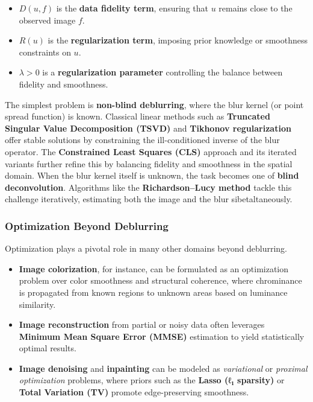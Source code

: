 \documentclass[11pt]{article}
\providecommand{\tightlist}{%
      \setlength{\itemsep}{0pt}\setlength{\parskip}{0pt}}
\begin{document}
\begin{itemize}
\tightlist
\item
  \(D(u, f)\) is the \textbf{data fidelity term}, ensuring that \(u\)
  remains close to the observed image \(f\).
\item
  \(R(u)\) is the \textbf{regularization term}, imposing prior knowledge
  or smoothness constraints on \(u\).
\item
  \(\lambda > 0\) is a \textbf{regularization parameter} controlling the
  balance between fidelity and smoothness.
\end{itemize}

The simplest problem is \textbf{non-blind deblurring}, where the blur
kernel (or point spread function) is known. Classical linear methods
such as \textbf{Truncated Singular Value Decomposition (TSVD)} and
\textbf{Tikhonov regularization} offer stable solutions by constraining
the ill-conditioned inverse of the blur operator. The
\textbf{Constrained Least Squares (CLS)} approach and its iterated
variants further refine this by balancing fidelity and smoothness in the
spatial domain. When the blur kernel itself is unknown, the task becomes
one of \textbf{blind deconvolution}. Algorithms like the
\textbf{Richardson--Lucy method} tackle this challenge iteratively,
estimating both the image and the blur sibetaltaneously.

\hypertarget{optimization-beyond-deblurring}{%
\subsubsection{\texorpdfstring{\textbf{Optimization Beyond
Deblurring}}{Optimization Beyond Deblurring}}\label{optimization-beyond-deblurring}}

Optimization plays a pivotal role in many other domains beyond
deblurring.

\begin{itemize}
\tightlist
\item
  \textbf{Image colorization}, for instance, can be formulated as an
  optimization problem over color smoothness and structural coherence,
  where chrominance is propagated from known regions to unknown areas
  based on luminance similarity.
\item
  \textbf{Image reconstruction} from partial or noisy data often
  leverages \textbf{Minimum Mean Square Error (MMSE)} estimation to
  yield statistically optimal results.
\item
  \textbf{Image denoising} and \textbf{inpainting} can be modeled as
  \emph{variational} or \emph{proximal optimization} problems, where
  priors such as the \textbf{Lasso (ℓ₁ sparsity)} or \textbf{Total
  Variation (TV)} promote edge-preserving smoothness.
\end{itemize}
\end{document}
